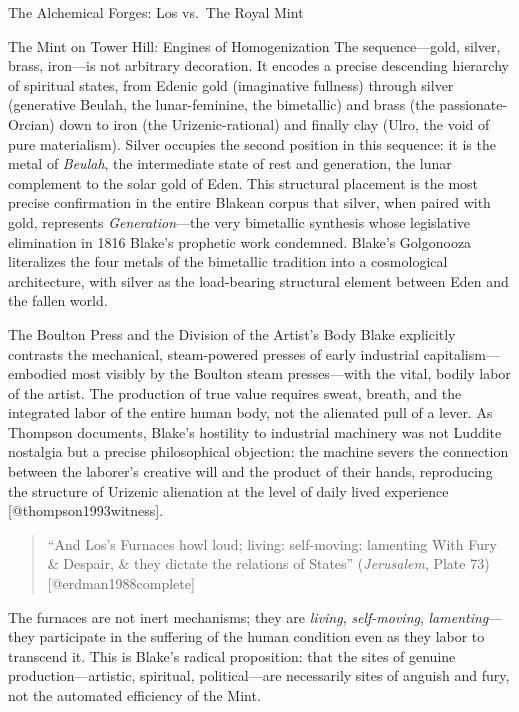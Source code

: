 \documentclass[
  ignorenonframetext,
]{beamer}
\begin{document}
\begin{frame}{The Alchemical Forges: Los vs.~The Royal Mint}
\begin{block}{The Mint on Tower Hill: Engines of Homogenization}
The sequence---gold, silver, brass, iron---is not arbitrary decoration.
It encodes a precise descending hierarchy of spiritual states, from
Edenic gold (imaginative fullness) through silver (generative Beulah,
the lunar-feminine, the bimetallic) and brass (the passionate-Orcian)
down to iron (the Urizenic-rational) and finally clay (Ulro, the void of
pure materialism). Silver occupies the second position in this sequence:
it is the metal of \emph{Beulah}, the intermediate state of rest and
generation, the lunar complement to the solar gold of Eden. This
structural placement is the most precise confirmation in the entire
Blakean corpus that silver, when paired with gold, represents
\emph{Generation}---the very bimetallic synthesis whose legislative
elimination in 1816 Blake's prophetic work condemned. Blake's Golgonooza
literalizes the four metals of the bimetallic tradition into a
cosmological architecture, with silver as the load-bearing structural
element between Eden and the fallen world.
\end{block}

\begin{block}{The Boulton Press and the Division of the Artist's Body}
\protect{}\label{the-boulton-press-and-the-division-of-the-artists-body}
Blake explicitly contrasts the mechanical, steam-powered presses of
early industrial capitalism---embodied most visibly by the Boulton steam
presses---with the vital, bodily labor of the artist. The production of
true value requires sweat, breath, and the integrated labor of the
entire human body, not the alienated pull of a lever. As Thompson
documents, Blake's hostility to industrial machinery was not Luddite
nostalgia but a precise philosophical objection: the machine severs the
connection between the laborer's creative will and the product of their
hands, reproducing the structure of Urizenic alienation at the level of
daily lived experience {[}@thompson1993witness{]}.

\begin{quote}
``And Los's Furnaces howl loud; living: self-moving: lamenting With Fury
\& Despair, \& they dictate the relations of States'' (\emph{Jerusalem},
Plate 73) {[}@erdman1988complete{]}
\end{quote}

The furnaces are not inert mechanisms; they are \emph{living},
\emph{self-moving}, \emph{lamenting}---they participate in the suffering
of the human condition even as they labor to transcend it. This is
Blake's radical proposition: that the sites of genuine
production---artistic, spiritual, political---are necessarily sites of
anguish and fury, not the automated efficiency of the Mint.
\end{block}


\end{frame}
\end{document}
